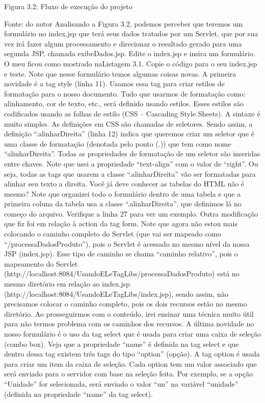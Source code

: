Figura 3.2: Fluxo de execução do projeto
 
Fonte: do autor
Analisando a Figura 3.2, podemos perceber que teremos um formulário no index.jsp que terá seus dados tratados por um Servlet, que por sua vez irá fazer algum processamento e direcionar o resultado gerado para uma segunda JSP, chamada exibeDados.jsp.
Edite o index.jsp e insira um formulário. O meu ficou como mostrado naListagem 3.1. Copie o código para o seu index.jsp e teste. 
Note que nesse formulário temos algumas coisas novas. A primeira novidade é a tag style (linha 11). Usamos essa tag para criar estilos de formatação para o nosso documento. Tudo que usarmos de formatação como: alinhamento, cor de texto, etc., será definido usando estilos. Esses estilos são codificados usando as folhas de estilo (CSS – Cascading Style Sheets). A sintaxe é muito simples. As definições em CSS são chamadas de seletores. Sendo assim, a definição “.alinharDireita” (linha 12) indica que queremos criar um seletor que é uma classe de formatação (denotada pelo ponto (.)) que tem como nome “alinharDireita”. Todas as propriedades de formatação de um seletor são inseridas entre chaves. Note que usei a propriedade “text-align” com o valor de “right”. Ou seja, todas as tags que usarem a classe “.alinharDireita” vão ser formatadas para alinhar seu texto a direita.
Você já deve conhecer as tabelas do HTML não é mesmo? Note que organizei todo o formulário dentro de uma tabela e que a primeira coluna da tabela usa a classe “.alinharDireita”, que definimos lá no começo do arquivo. Verifique a linha 27 para ver um exemplo. Outra modificação que fiz foi em relação à action da tag form. Note que agora não estou mais colocando o caminho completo do Servlet (que vai ser mapeado como “/processaDadosProduto”), pois o Servlet é acessado no mesmo nível da nossa JSP (index.jsp). Esse tipo de caminho se chama “caminho relativo”, pois o mapeamento do Servlet (http://localhost:8084/UsandoELeTagLibs/processaDadosProduto) está no mesmo diretório em relação ao index.jsp (http://localhost:8084/UsandoELeTagLibs/index.jsp), sendo assim, não precisamos colocar o caminho completo, pois os dois recursos estão no mesmo diretório. Ao prosseguirmos com o conteúdo, irei ensinar uma técnica muito útil para não termos problema com os caminhos dos recursos.
A última novidade no nosso formulário é o uso da tag select que é usada para criar uma caixa de seleção (combo box). Veja que a propriedade “name” é definida na tag select e que dentro dessa tag existem três tags do tipo “option” (opção). A tag option é usada para criar um item da caixa de seleção. Cada option tem um valor associado que será enviado para o servidor com base na seleção feita. Por exemplo, se a opção “Unidade” for selecionada, será enviado o valor “un” na variável “unidade” (definida na propriedade “name” da tag select).
